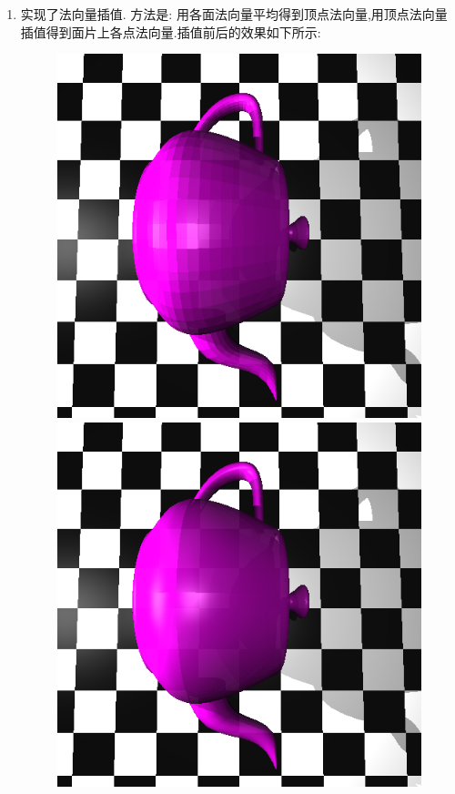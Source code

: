 \begin{enumerate}
\item 实现了法向量插值. 方法是: 用各面法向量平均得到顶点法向量,用顶点法向量插值得到面片上各点法向量.插值前后的效果如下所示:
\begin{figure}[H]
\begin{minipage}[b]{0.46\linewidth}
  \centering
  \includegraphics[width=\textwidth]{res/rough.png}
\end{minipage}
\begin{minipage}[b]{0.46\linewidth}
  \centering
  \includegraphics[width=\textwidth]{res/smooth.png}
\end{minipage}
\end{figure}


\end{enumerate}
